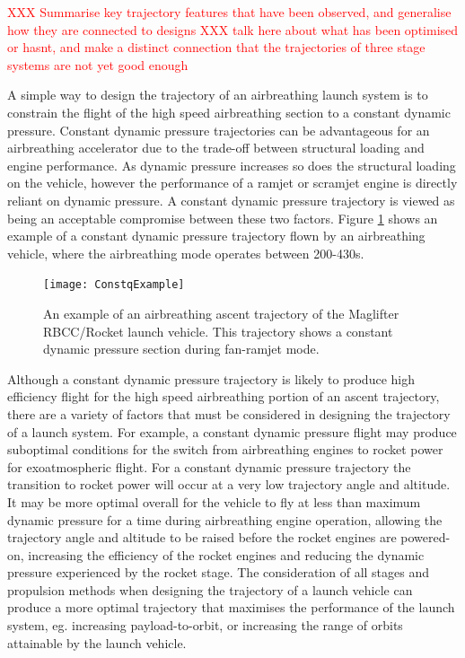 \textcolor{red}{XXX Summarise key trajectory features that have been observed, and generalise how they are connected to designs}
\textcolor{red}{XXX talk here about what has been optimised or hasnt, and make a distinct connection that the trajectories of three stage systems are not yet good enough}
	
A simple way to design the trajectory of an airbreathing launch system is to constrain the flight of the high speed airbreathing section to a constant dynamic pressure\cite{Olds1998,Preller2015,Punnoose2007,Kanda1996,Young2006}. 
Constant dynamic pressure trajectories can be advantageous for an airbreathing accelerator due to the trade-off between structural loading and engine performance\cite{Olds1998}. As dynamic pressure increases so does the structural loading on the vehicle, however the performance of a ramjet or scramjet engine is directly reliant on dynamic pressure\cite{Olds1998}. A constant dynamic pressure trajectory is viewed as being an acceptable compromise between these two factors. Figure \ref{fig:constqexample} shows an example of a constant dynamic pressure trajectory flown by an airbreathing vehicle, where the airbreathing mode operates between 200-430s. 

\begin{figure}[ht]
	\centering
	\texttt{[image: ConstqExample]}
	\caption{An example of an airbreathing ascent trajectory of the Maglifter RBCC/Rocket launch vehicle\cite{Olds1998}. This trajectory shows a constant dynamic pressure section during fan-ramjet mode\cite{Olds1998}.}
	\label{fig:constqexample}
\end{figure}
Although a constant dynamic pressure trajectory is likely to produce high efficiency flight for the high speed airbreathing portion of an ascent trajectory, there are a variety of factors that must be considered in designing the trajectory of a launch system. 
For example, a constant dynamic pressure flight may produce suboptimal conditions for the switch from airbreathing engines to rocket power for exoatmospheric flight. 
For a constant dynamic pressure trajectory the transition to rocket power will occur at a very low trajectory angle and altitude\cite{Preller2017b}. 
It may be more optimal overall for the vehicle to fly at less than maximum dynamic pressure for a time during airbreathing engine operation, allowing the trajectory angle and altitude to be raised before the rocket engines are powered-on, increasing the efficiency of the rocket engines and reducing the dynamic pressure experienced by the rocket stage\cite{Tsuchiya2005,Wilhite1991,Mehta2001}.
The consideration of all stages and propulsion methods when designing the trajectory of a launch vehicle can produce a more optimal trajectory that maximises the performance of the launch system, eg. increasing payload-to-orbit, or increasing the range of orbits attainable by the launch vehicle.


